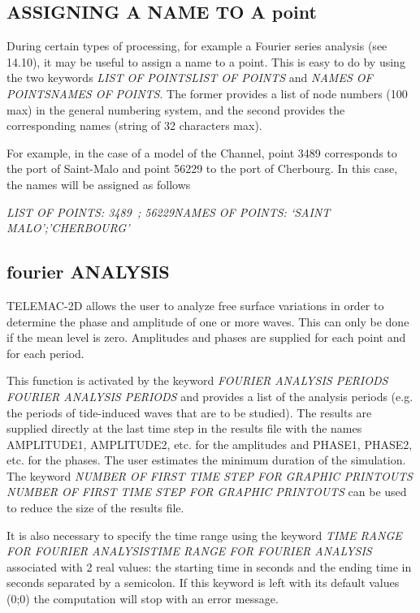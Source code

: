 \documentclass{article} %
\begin{document}
\subsection{ ASSIGNING A NAME TO A point}

 During certain types of processing, for example a Fourier series analysis (see 14.10), it may be useful to assign a name to a point. This is easy to do by using the two keywords \textit{LIST OF POINTSLIST OF POINTS} and \textit{NAMES OF POINTSNAMES OF POINTS}. The former provides a list of node numbers (100 max) in the general numbering system, and the second provides the corresponding names (string of 32 characters max).

 For example, in the case of a model of the Channel, point 3489 corresponds to the port of Saint-Malo and point 56229 to the port of Cherbourg. In this case, the names will be assigned as follows

 \textit{LIST OF POINTS: 3489~; 56229NAMES OF POINTS: `SAINT MALO';'CHERBOURG'}


\subsection{ fourier ANALYSIS}

 TELEMAC-2D allows the user to analyze free surface variations in order to determine the phase and amplitude of one or more waves. This can only be done if the mean level is zero. Amplitudes and phases are supplied for each point and for each period.

 This function is activated by the keyword \textit{FOURIER ANALYSIS PERIODS} \textit{ FOURIER ANALYSIS  PERIODS} and provides a list of the analysis periods (e.g. the periods of tide-induced waves that are to be studied). The results are supplied directly at the last time step in the results file with the names AMPLITUDE1, AMPLITUDE2, etc. for the amplitudes and PHASE1, PHASE2, etc. for the phases. The user estimates the minimum duration of the simulation. The keyword \textit{NUMBER OF FIRST TIME STEP FOR GRAPHIC PRINTOUTS} \textit{NUMBER OF FIRST TIME STEP FOR GRAPHIC PRINTOUTS} can be used to reduce the size of the results file.

 It is also necessary to specify the time range using the keyword \textit{TIME RANGE FOR FOURIER ANALYSISTIME RANGE FOR FOURIER ANALYSIS} associated with 2 real values: the starting time in seconds and the ending time in seconds separated by a semicolon. If this keyword is left with its default values (0;0) the computation will stop with an error message.
\end{document}
